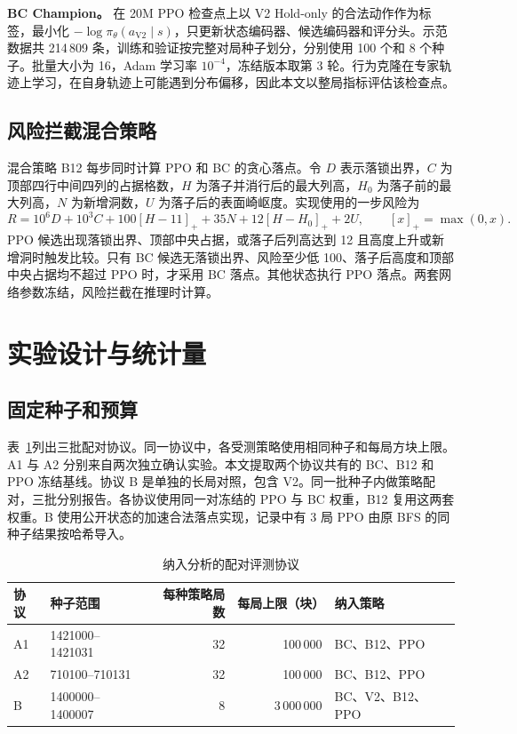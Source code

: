 \documentclass[UTF8,fontset=none,zihao=-4,a4paper]{ctexart}
\newcommand{\1}{\mathbf{1}}
\begin{document}
\textbf{BC Champion。} 在 20M PPO 检查点上以 V2 Hold-only 的合法动作作为标签，最小化 $-\log\pi_\theta(a_{\mathrm{V2}}\mid s)$，只更新状态编码器、候选编码器和评分头。示范数据共 214\,809 条，训练和验证按完整对局种子划分，分别使用 100 个和 8 个种子。批量大小为 16，Adam 学习率 $10^{-4}$，冻结版本取第 3 轮\cite{bcdata}。行为克隆在专家轨迹上学习，在自身轨迹上可能遇到分布偏移\cite{ross2011}，因此本文以整局指标评估该检查点。

\subsection{风险拦截混合策略}

混合策略 B12 每步同时计算 PPO 和 BC 的贪心落点。令 $D$ 表示落锁出界，$C$ 为顶部四行中间四列的占据格数，$H$ 为落子并消行后的最大列高，$H_0$ 为落子前的最大列高，$N$ 为新增洞数，$U$ 为落子后的表面崎岖度。实现使用的一步风险为
\begin{equation}
    R = 10^6D + 10^3C + 100[H-11]_+ + 35N + 12[H-H_0]_+ + 2U,
    \qquad [x]_+=\max(0,x).
    \label{eq:risk}
\end{equation}
PPO 候选出现落锁出界、顶部中央占据，或落子后列高达到 12 且高度上升或新增洞时触发比较。只有 BC 候选无落锁出界、风险至少低 100、落子后高度和顶部中央占据均不超过 PPO 时，才采用 BC 落点。其他状态执行 PPO 落点。两套网络参数冻结，风险拦截在推理时计算\cite{hybrid}。

\section{实验设计与统计量}

\subsection{固定种子和预算}

表~\ref{tab:protocol}列出三批配对协议。同一协议中，各受测策略使用相同种子和每局方块上限。A1 与 A2 分别来自两次独立确认实验\cite{aone,atwo}。本文提取两个协议共有的 BC、B12 和 PPO 冻结基线。协议 B 是单独的长局对照，包含 V2。同一批种子内做策略配对，三批分别报告。各协议使用同一对冻结的 PPO 与 BC 权重，B12 复用这两套权重。B 使用公开状态的加速合法落点实现，记录中有 3 局 PPO 由原 BFS 的同种子结果按哈希导入\cite{longcode}。

\begin{table}[htbp]
\centering
\caption{纳入分析的配对评测协议}
\label{tab:protocol}
\small
\begin{tabular}{llrrl}
\toprule
协议 & 种子范围 & 每种策略局数 & 每局上限（块） & 纳入策略 \\
\midrule
A1 & 1421000--1421031 & 32 & 100\,000 & BC、B12、PPO \\
A2 & 710100--710131 & 32 & 100\,000 & BC、B12、PPO \\
B  & 1400000--1400007 & 8  & 3\,000\,000 & BC、V2、B12、PPO \\
\bottomrule
\end{tabular}
\end{table}
\end{document}
